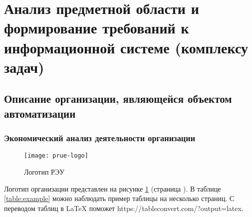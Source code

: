 \documentclass[../thesis.tex]{subfiles}
\begin{document}
\section{Анализ предметной области и формирование требований к информационной системе (комплексу задач)} \label{section:theory}
\subsection{Описание организации, являющейся объектом автоматизации} \label{subsection:organization}
\subsubsection{Экономический анализ деятельности организации}

\begin{figure}[h!]
    \centering
    \texttt{[image: prue-logo]}
    \caption{Логотип РЭУ }
    \label{fig:prue:logo}
\end{figure}

Логотип организации представлен на рисунке \ref{fig:prue:logo} (страница \pageref{fig:prue:logo}). В таблице \ref{table:example} можно наблюдать пример таблицы на несколько страниц. С переводом таблиц в \LaTeX{} поможет https://tableconvert.com/?output=latex.
\end{document}
